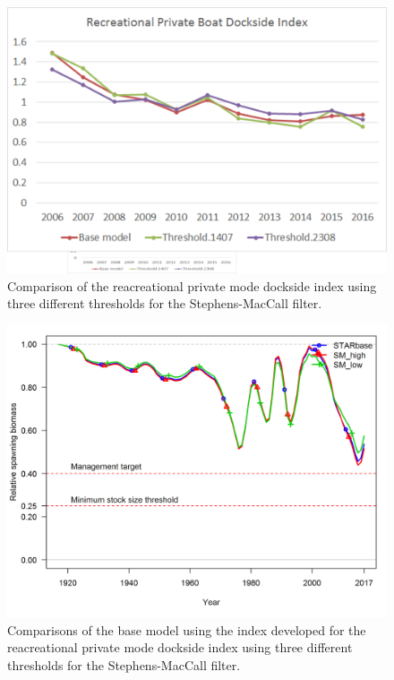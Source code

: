 \documentclass[12pt,]{article}
\begin{document}
\begin{figure}[htbp]
\centering
\includegraphics{Figures/Request3a.png}
\caption{Comparison of the reacreational private mode dockside index
using three different thresholds for the Stephens-MacCall filter.
\label{fig:Request3a}}
\end{figure}

\begin{figure}[htbp]
\centering
\includegraphics{Figures/Request3b.png}
\caption{Comparisons of the base model using the index developed for the
reacreational private mode dockside index using three different
thresholds for the Stephens-MacCall filter.\label{fig:Request3b}}
\end{figure}
\end{document}
